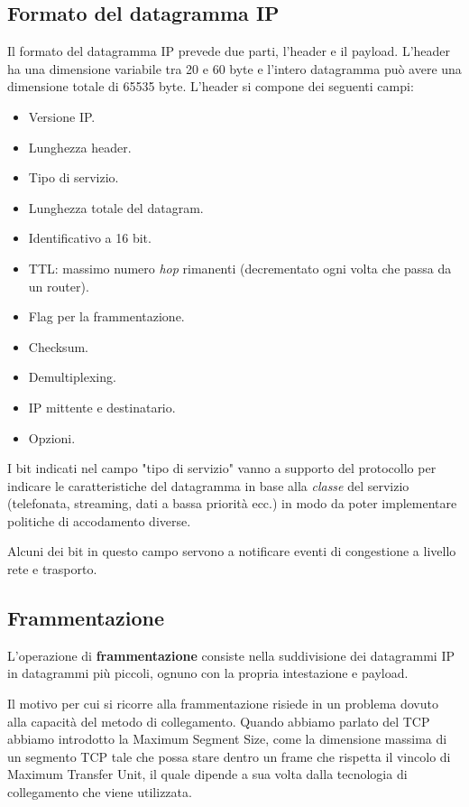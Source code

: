 \subsection{Formato del datagramma IP}
Il formato del datagramma IP prevede due parti, l'header e il payload. L'header ha una dimensione
variabile tra 20 e 60 byte e l'intero datagramma può avere una dimensione totale di 65535 byte.
L'header si compone dei seguenti campi:
\begin{itemize}
	\item Versione IP.
	\item Lunghezza header.
	\item Tipo di servizio.
	\item Lunghezza totale del datagram.
	\item Identificativo a 16 bit.
	\item TTL: massimo numero \emph{hop} rimanenti (decrementato ogni volta che passa da un 
		router).
	\item Flag per la frammentazione.
	\item Checksum.
	\item Demultiplexing.
	\item IP mittente e destinatario.
	\item Opzioni.
\end{itemize}
I bit indicati nel campo "tipo di servizio" vanno a supporto del protocollo per indicare le 
caratteristiche del datagramma in base alla \emph{classe} del servizio (telefonata, streaming, 
dati a bassa priorità ecc.) in modo da poter implementare politiche di accodamento diverse.

Alcuni dei bit in questo campo servono a notificare eventi di congestione a livello rete e 
trasporto.

\subsection{Frammentazione}
L'operazione di \textbf{frammentazione} consiste nella suddivisione dei datagrammi IP in 
datagrammi più piccoli, ognuno con la propria intestazione e payload.

Il motivo per cui si ricorre alla frammentazione risiede in un problema dovuto alla capacità del
metodo di collegamento. Quando abbiamo parlato del TCP abbiamo introdotto la Maximum Segment Size,
come la dimensione massima di un segmento TCP tale che possa stare dentro un frame che rispetta il
vincolo di Maximum Transfer Unit, il quale dipende a sua volta dalla tecnologia di collegamento 
che viene utilizzata.

